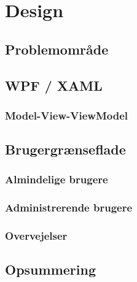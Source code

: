 \chapter{Design}
\label{Design}

\section{Problemområde}

\section{WPF / XAML}
\subsection{Model-View-ViewModel}

\section{Brugergrænseflade}
\subsection{Almindelige brugere}
\subsection{Administrerende brugere}
\subsection{Overvejelser}

\section{Opsummering}



